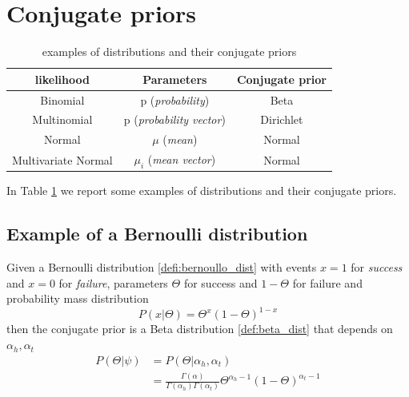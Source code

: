 \section{Conjugate priors}
    
    \begin{table}[H]
        \centering
        \begin{tabular}{|c|c|c|}
            \hline
            \textbf{likelihood} & \textbf{Parameters} & \textbf{Conjugate prior}  \\
            \hline
            Binomial & p (\textit{probability}) & Beta  \\
            \hline
            Multinomial & p (\textit{probability vector}) & Dirichlet \\
            \hline
            Normal & $\mu$ (\textit{mean}) & Normal \\
            \hline
            Multivariate Normal & $\mu_i$ (\textit{mean vector}) & Normal \\
            \hline
        \end{tabular}
        \caption{examples of distributions and their conjugate priors}
        \label{table:conj_priors}
    \end{table}
    
    In Table \ref{table:conj_priors} we report some examples of distributions and their conjugate priors.\\

    \subsection{Example of a Bernoulli distribution}
        Given a Bernoulli distribution \ref{defi:bernoullo_dist} with events $x=1$ for \textit{success} and $x=0$ for \textit{failure}, parameters $\Theta$ for success and $1-\Theta$ for failure and probability mass distribution 
        $$P(x|\Theta) = \Theta^x(1-\Theta)^{1-x}$$
        then the conjugate prior is a Beta distribution \ref{def:beta_dist} that depends on $\alpha_h, \alpha_t$
        \begin{align*}
        P(\Theta|\psi)  &= P(\Theta|\alpha_h, \alpha_t)\\
                        &= \frac{\Gamma(\alpha)}{\Gamma(\alpha_h)\Gamma(\alpha_t)} \Theta^{\alpha_h -1} (1-\Theta)^{\alpha_t -1}
        \end{align*}
        
